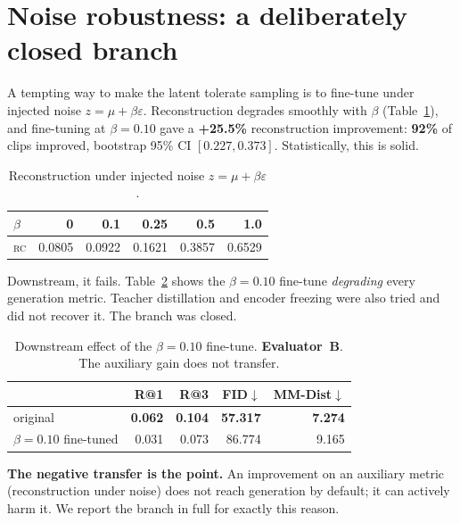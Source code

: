 \documentclass[11pt,a4paper]{report}
\newcommand{\rc}{\textsc{rc}}
\newcommand{\best}[1]{\textbf{#1}}
\begin{document}
\section{Noise robustness: a deliberately closed branch}
\label{sec:noise}

A tempting way to make the latent tolerate sampling is to fine-tune under
injected noise $z=\mu+\beta\varepsilon$. Reconstruction degrades smoothly
with $\beta$ (Table~\ref{tab:noise-sweep}), and fine-tuning at
$\beta=0.10$ gave a \textbf{+25.5\%} reconstruction improvement:
\textbf{92\%} of clips improved, bootstrap 95\% CI $[0.227, 0.373]$.
Statistically, this is solid.

\begin{table}[H]
\centering
\caption{Reconstruction under injected noise $z=\mu+\beta\varepsilon$.}
\label{tab:noise-sweep}
\small
\begin{tabular}{@{}lrrrrr@{}}
\toprule
$\beta$ & 0 & 0.1 & 0.25 & 0.5 & 1.0 \\
\midrule
\rc & 0.0805 & 0.0922 & 0.1621 & 0.3857 & 0.6529 \\
\bottomrule
\end{tabular}
\end{table}

Downstream, it fails. Table~\ref{tab:noise-downstream} shows the
$\beta=0.10$ fine-tune \emph{degrading} every generation metric.
Teacher distillation and encoder freezing were also tried and did not
recover it. The branch was closed.

\begin{table}[H]
\centering
\caption{Downstream effect of the $\beta=0.10$ fine-tune.
\textbf{Evaluator~B}. The auxiliary gain does not transfer.}
\label{tab:noise-downstream}
\small
\begin{tabular}{@{}lrrrr@{}}
\toprule
 & R@1 & R@3 & FID$\downarrow$ & MM-Dist$\downarrow$ \\
\midrule
original & \best{0.062} & \best{0.104} & \best{57.317} & \best{7.274} \\
$\beta=0.10$ fine-tuned & 0.031 & 0.073 & 86.774 & 9.165 \\
\bottomrule
\end{tabular}
\end{table}

\textbf{The negative transfer is the point.} An improvement on an auxiliary
metric (reconstruction under noise) does not reach generation by default;
it can actively harm it. We report the branch in full for exactly this
reason.
\end{document}
